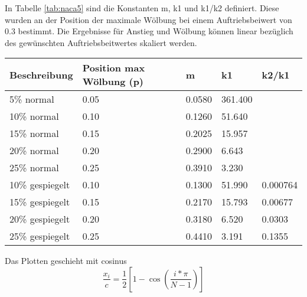 \documentclass[12pt]{scrreprt}
\begin{document}
In Tabelle \ref{tab:naca5} sind die Konstanten m, k1 und k1/k2 definiert. Diese wurden an der Position der maximale W\"olbung bei einem Auftriebsbeiwert von 0.3 bestimmt. Die Ergebnisse f\"ur Anstieg und W\"olbung k\"onnen linear bez\"uglich des gew\"unschten Auftriebsbeitwertes skaliert werden.\\

\begin{tabular}{lllll}\label{tab:naca5}
Beschreibung & Position max W\"olbung (p) & m & k1 & k2/k1 \\
\hline
5\% normal &  0.05 & 0.0580 & 361.400 & \\
10\% normal & 0.10 & 0.1260 &  51.640 &\\
15\% normal & 0.15 & 0.2025 &  15.957 & \\
20\% normal & 0.20 & 0.2900 &   6.643 & \\
25\% normal & 0.25 & 0.3910 &   3.230 & \\
10\% gespiegelt & 0.10 & 0.1300 &   51.990 & 0.000764 \\
15\% gespiegelt & 0.15 & 0.2170 &   15.793 & 0.00677 \\
20\% gespiegelt & 0.20 & 0.3180 &   6.520  & 0.0303 \\
25\% gespiegelt & 0.25 & 0.4410 &   3.191 & 0.1355 \\
\hline
\end{tabular}



Das Plotten geschieht mit cosinus
\begin{equation}
     \frac{x_i}{c} = \frac{1}{2} \left[ 1 - \cos \left( \frac{i * \pi}{N-1} \right) \right]
\end{equation}
\end{document}
